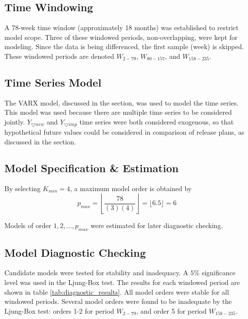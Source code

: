 \documentclass[a4paper]{scrartcl}
\begin{document}
\subsection*{Time Windowing}
A 78-week time window (approximately 18 months) was established to restrict model scope. Three of these windowed periods, non-overlapping, were kept for modeling. Since the data is being differenced, the first sample (week) is skipped. These windowed periods are denoted $W_{2-79}$, $W_{80-157}$, and $W_{158-235}$.

\subsection*{Time Series Model}

The VARX model, discussed in the  section, was used to model the time series. This model was used because there are multiple time series to be considered jointly. $Y_{\bigtriangledown new}$ and $Y_{\bigtriangledown imp}$ time series were both considered exogenous, so that hypothetical future values could be considered in comparison of release plans, as discussed in the  section.

\subsection*{Model Specification \& Estimation}

By selecting $K_{min} = 4$, a maximum model order is obtained by
\begin{equation}
p_{max} = \left \lfloor \frac{78}{(3)(4)} \right \rfloor = \lfloor 6.5 \rfloor = 6
\end{equation}

Models of order $1,2,...,p_{max}$ were estimated for later diagnostic checking.

\subsection*{Model Diagnostic Checking}

Candidate models were tested for stability and inadequacy. A $5\%$ significance level was used in the Ljung-Box test. The results for each windowed period are shown in table \ref{tab:diagnostic_results}. All model orders were stable for all windowed periods. Several model orders were found to be inadequate by the Ljung-Box test: orders 1-2 for period $W_{2-79}$, and order 5 for period $W_{158-235}$.
\end{document}
